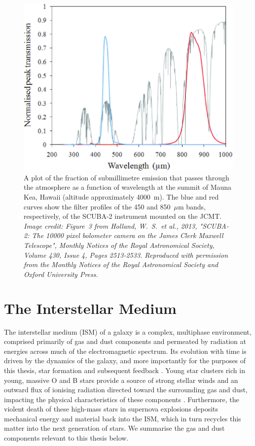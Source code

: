 \begin{figure}[!h]
 \begin{center}
 \includegraphics[width=\columnwidth]{ch1/Holland2013_transmission_plot.eps}
  \caption[Atmospheric transmission as a function of frequency at the summit of Mauna Kea]{A plot of the fraction of submillimetre emission that passes through the atmosphere as a function of wavelength at the summit of Mauna Kea, Hawaii (altitude approximately 4000~m).  The blue and red curves show the filter profiles of the 450 and 850~$\mu$m bands, respectively, of the SCUBA-2 instrument mounted on the JCMT.  \emph{Image credit: Figure~3 from Holland, W.~S.~et al., 2013, "SCUBA-2: The 10000 pixel bolometer camera on the James Clerk Maxwell Telescope", Monthly Notices of the Royal Astronomical Society, Volume 430, Issue 4, Pages 2513-2533.  Reproduced with permission from the Monthly Notices of the Royal Astronomical Society and Oxford University Press.}
  \label{fig:atmos_trans}}
 \end{center}
\end{figure}

\section{The Interstellar Medium} \label{ism}
The interstellar medium (ISM) of a galaxy is a complex, multiphase environment, comprised primarily of gas and dust components and permeated by radiation at energies across much of the electromagnetic spectrum.  Its evolution with time is driven by the dynamics of the galaxy, and more importantly for the purposes of this thesis, star formation and subsequent feedback \citep{2005pcim.book.....T}.  Young star clusters rich in young, massive O and B stars provide a source of strong stellar winds and an outward flux of ionising radiation directed toward the surrounding gas and dust, impacting the physical characteristics of these components \citep{2007ARA&A..45..481Z}.  Furthermore, the violent death of these high-mass stars in supernova explosions deposits mechanical energy and material back into the ISM, which in turn recycles this matter into the next generation of stars.  We summarise the gas and dust components relevant to this thesis below.

